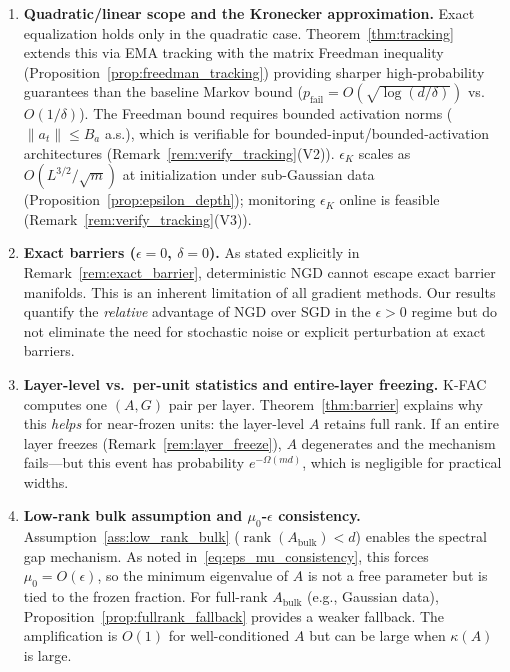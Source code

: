 \documentclass{article}
\providecommand{\norm}[1]{\lVert #1 \rVert}
\DeclareMathOperator{\rank}{rank}
\theoremstyle{plain}
\theoremstyle{definition}
\theoremstyle{remark}
\begin{document}
\begin{enumerate}
\item \textbf{Quadratic/linear scope and the Kronecker approximation.} Exact equalization holds only in the quadratic case. Theorem~\ref{thm:tracking} extends this via EMA tracking with the matrix Freedman inequality (Proposition~\ref{prop:freedman_tracking}) providing sharper high-probability guarantees than the baseline Markov bound ($p_{\mathrm{fail}} = O(\sqrt{\log(d/\delta)})$ vs.\ $O(1/\delta)$). The Freedman bound requires bounded activation norms ($\norm{a_t} \leq B_a$ a.s.), which is verifiable for bounded-input/bounded-activation architectures (Remark~\ref{rem:verify_tracking}(V2)). $\epsilon_K$ scales as $O(L^{3/2}/\sqrt{m})$ at initialization under sub-Gaussian data (Proposition~\ref{prop:epsilon_depth}); monitoring $\epsilon_K$ online is feasible (Remark~\ref{rem:verify_tracking}(V3)).

\item \textbf{Exact barriers ($\epsilon = 0$, $\delta = 0$).} As stated explicitly in Remark~\ref{rem:exact_barrier}, deterministic NGD cannot escape exact barrier manifolds. This is an inherent limitation of all gradient methods. Our results quantify the \emph{relative} advantage of NGD over SGD in the $\epsilon > 0$ regime but do not eliminate the need for stochastic noise or explicit perturbation at exact barriers.

\item \textbf{Layer-level vs.\ per-unit statistics and entire-layer freezing.} K-FAC computes one $(A, G)$ pair per layer. Theorem~\ref{thm:barrier} explains why this \emph{helps} for near-frozen units: the layer-level $A$ retains full rank. If an entire layer freezes (Remark~\ref{rem:layer_freeze}), $A$ degenerates and the mechanism fails---but this event has probability $e^{-\Omega(md)}$, which is negligible for practical widths.

\item \textbf{Low-rank bulk assumption and $\mu_0$-$\epsilon$ consistency.} Assumption~\ref{ass:low_rank_bulk} ($\rank(A_{\mathrm{bulk}}) < d$) enables the spectral gap mechanism. As noted in~\eqref{eq:eps_mu_consistency}, this forces $\mu_0 = O(\epsilon)$, so the minimum eigenvalue of $A$ is not a free parameter but is tied to the frozen fraction. For full-rank $A_{\mathrm{bulk}}$ (e.g., Gaussian data), Proposition~\ref{prop:fullrank_fallback} provides a weaker fallback. The amplification is $O(1)$ for well-conditioned $A$ but can be large when $\kappa(A)$ is large.


\end{enumerate}
\end{document}

